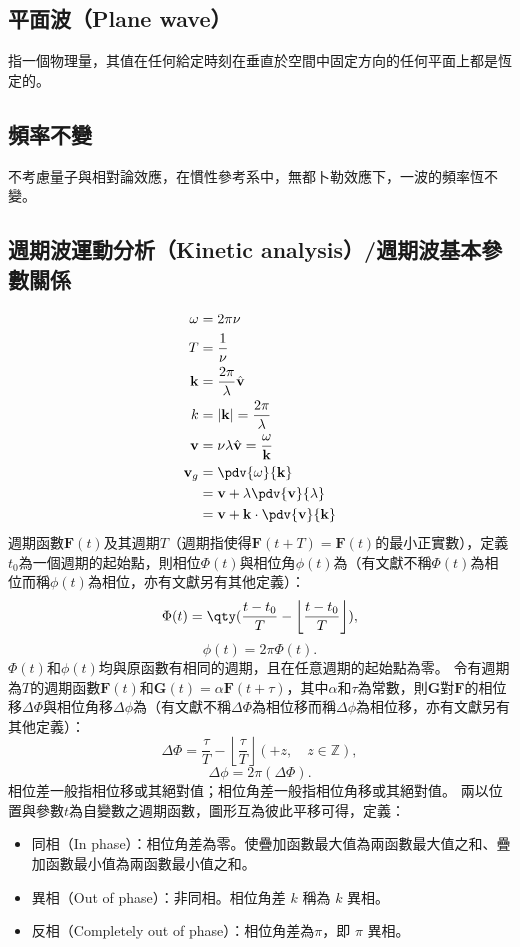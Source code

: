 \documentclass[a4paper,12pt]{report}
\begin{document}
\subsection{平面波（Plane wave）}
指一個物理量，其值在任何給定時刻在垂直於空間中固定方向的任何平面上都是恆定的。
\subsection{頻率不變}
不考慮量子與相對論效應，在慣性參考系中，無都卜勒效應下，一波的頻率恆不變。
\subsection{週期波運動分析（Kinetic analysis）/週期波基本參數關係}
\[\begin{aligned}
\omega &= 2\pi \nu \\
T &= \frac{1}{\nu} \\
\mathbf{k} &= \frac{2\pi}{\lambda}\hat{\mathbf{v}} \\
k &= |\mathbf{k}| = \frac{2\pi}{\lambda} \\
\mathbf{v} &= \nu \lambda \hat{\mathbf{v}} = \frac{\omega}{\mathbf{k}} \\
\mathbf{v}_g &= \pdv{\omega}{\mathbf{k}} \\
&= \mathbf{v}+\lambda \pdv{\mathbf{v}}{\lambda} \\
&= \mathbf{v}+\mathbf{k} \cdot\pdv{\mathbf{v}}{\mathbf{k}}
\end{aligned}\]
週期函數$\mathbf{F}(t)$及其週期$T$（週期指使得$\mathbf{F}(t+T)=\mathbf{F}(t)$的最小正實數），定義$t_0$為一個週期的起始點，則相位$\Phi(t)$與相位角$\phi (t)$為（有文獻不稱$\Phi(t)$為相位而稱$\phi(t)$為相位，亦有文獻另有其他定義）：
\[\Phi(t)=\qty(\frac{t-t_0}{T}-\left\lfloor\frac{t-t_0}{T}\right\rfloor),\]
\[\phi(t)=2\pi\Phi(t).\]
$\Phi(t)$和$\phi(t)$均與原函數有相同的週期，且在任意週期的起始點為零。
令有週期為$T$的週期函數$\mathbf{F}(t)$和$\mathbf{G}(t)=\alpha \mathbf{F}(t+\tau)$，其中$\alpha$和$\tau$為常數，則$\mathbf{G}$對$\mathbf{F}$的相位移$\Delta\Phi$與相位角移$\Delta\phi$為（有文獻不稱$\Delta\Phi$為相位移而稱$\Delta\phi$為相位移，亦有文獻另有其他定義）：
\[\Delta\Phi=\frac{\tau}{T}-\left\lfloor\frac{\tau}{T}\right\rfloor(+z,\quad z\in\mathbb{Z}),\]
\[\Delta\phi=2\pi(\Delta\Phi).\]
相位差一般指相位移或其絕對值；相位角差一般指相位角移或其絕對值。
兩以位置與參數$t$為自變數之週期函數，圖形互為彼此平移可得，定義：
\begin{itemize}
\item 同相（In phase）：相位角差為零。使疊加函數最大值為兩函數最大值之和、疊加函數最小值為兩函數最小值之和。
\item 異相（Out of phase）：非同相。相位角差 $k$ 稱為 $k$ 異相。
\item 反相（Completely out of phase）：相位角差為$\pi$，即 $\pi$ 異相。
\end{itemize}
\end{document}
